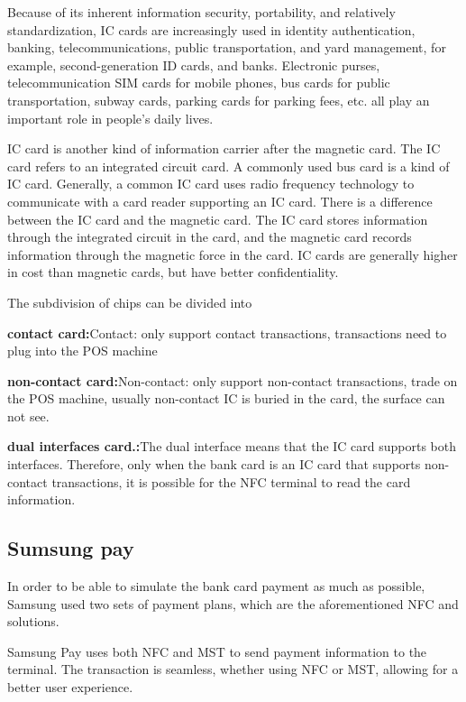 \documentclass[journal]{IEEEtran}
\begin{document}
Because of its inherent information security, portability, and relatively standardization, IC cards are increasingly used in identity authentication, banking, telecommunications, public transportation, and yard management, for example, second-generation ID cards, and banks. Electronic purses, telecommunication SIM cards for mobile phones, bus cards for public transportation, subway cards, parking cards for parking fees, etc. all play an important role in people's daily lives.

IC card is another kind of information carrier after the magnetic card. The IC card refers to an integrated circuit card. A commonly used bus card is a kind of IC card. Generally, a common IC card uses radio frequency technology to communicate with a card reader supporting an IC card. There is a difference between the IC card and the magnetic card. The IC card stores information through the integrated circuit in the card, and the magnetic card records information through the magnetic force in the card. IC cards are generally higher in cost than magnetic cards, but have better confidentiality.

The subdivision of chips can be divided into 

\textbf{contact card:}Contact: only support contact transactions, transactions need to plug into the POS machine

\textbf{non-contact card:}Non-contact: only support non-contact transactions, trade on the POS machine, usually non-contact IC is buried in the card, the surface can not see.

\textbf{dual interfaces card.:}The dual interface means that the IC card supports both interfaces. Therefore, only when the bank card is an IC card that supports non-contact transactions, it is possible for the NFC terminal to read the card information.





\subsection{Sumsung pay}
In order to be able to simulate the bank card payment as much as possible, Samsung used two sets of payment plans, which are the aforementioned NFC and solutions.

Samsung Pay uses both NFC and MST to send payment information to the terminal. The transaction is seamless, whether using NFC or MST, allowing for a better user experience.
\end{document}
